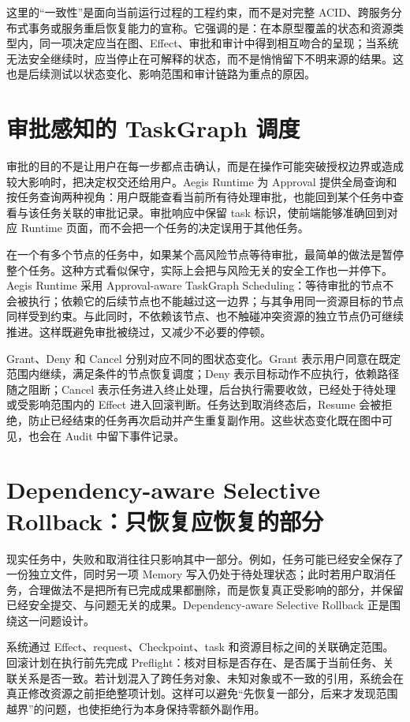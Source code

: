 这里的“一致性”是面向当前运行过程的工程约束，而不是对完整 ACID、跨服务分布式事务或服务重启恢复能力的宣称。它强调的是：在本原型覆盖的状态和资源类型内，同一项决定应当在图、Effect、审批和审计中得到相互吻合的呈现；当系统无法安全继续时，应当停止在可解释的状态，而不是悄悄留下不明来源的结果。这也是后续测试以状态变化、影响范围和审计链路为重点的原因。

\section{审批感知的 TaskGraph 调度}

审批的目的不是让用户在每一步都点击确认，而是在操作可能突破授权边界或造成较大影响时，把决定权交还给用户。Aegis Runtime 为 Approval 提供全局查询和按任务查询两种视角：用户既能查看当前所有待处理审批，也能回到某个任务中查看与该任务关联的审批记录。审批响应中保留 task 标识，使前端能够准确回到对应 Runtime 页面，而不会把一个任务的决定误用于其他任务。

在一个有多个节点的任务中，如果某个高风险节点等待审批，最简单的做法是暂停整个任务。这种方式看似保守，实际上会把与风险无关的安全工作也一并停下。Aegis Runtime 采用 Approval-aware TaskGraph Scheduling：等待审批的节点不会被执行；依赖它的后续节点也不能越过这一边界；与其争用同一资源目标的节点同样受到约束。与此同时，不依赖该节点、也不触碰冲突资源的独立节点仍可继续推进。这样既避免审批被绕过，又减少不必要的停顿。

Grant、Deny 和 Cancel 分别对应不同的图状态变化。Grant 表示用户同意在既定范围内继续，满足条件的节点恢复调度；Deny 表示目标动作不应执行，依赖路径随之阻断；Cancel 表示任务进入终止处理，后台执行需要收敛，已经处于待处理或受影响范围内的 Effect 进入回滚判断。任务达到取消终态后，Resume 会被拒绝，防止已经结束的任务再次启动并产生重复副作用。这些状态变化既在图中可见，也会在 Audit 中留下事件记录。

\section{Dependency-aware Selective Rollback：只恢复应恢复的部分}

现实任务中，失败和取消往往只影响其中一部分。例如，任务可能已经安全保存了一份独立文件，同时另一项 Memory 写入仍处于待处理状态；此时若用户取消任务，合理做法不是把所有已完成成果都删除，而是恢复真正受影响的部分，并保留已经安全提交、与问题无关的成果。Dependency-aware Selective Rollback 正是围绕这一问题设计。

系统通过 Effect、request、Checkpoint、task 和资源目标之间的关联确定范围。回滚计划在执行前先完成 Preflight：核对目标是否存在、是否属于当前任务、关联关系是否一致。若计划混入了跨任务对象、未知对象或不一致的引用，系统会在真正修改资源之前拒绝整项计划。这样可以避免“先恢复一部分，后来才发现范围越界”的问题，也使拒绝行为本身保持零额外副作用。

